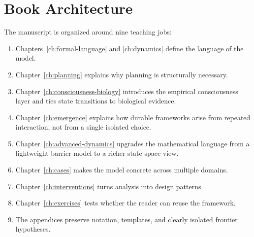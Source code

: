 \section{Book Architecture}

The manuscript is organized around nine teaching jobs:
\begin{enumerate}[nosep]
  \item Chapters~\ref{ch:formal-language} and \ref{ch:dynamics} define the
        language of the model.
  \item Chapter~\ref{ch:planning} explains why planning is structurally
        necessary.
  \item Chapter~\ref{ch:consciousness-biology} introduces the empirical
        consciousness layer and ties state transitions to biological evidence.
  \item Chapter~\ref{ch:emergence} explains how durable frameworks arise from
        repeated interaction, not from a single isolated choice.
  \item Chapter~\ref{ch:advanced-dynamics} upgrades the mathematical language
        from a lightweight barrier model to a richer state-space view.
  \item Chapter~\ref{ch:cases} makes the model concrete across multiple
        domains.
  \item Chapter~\ref{ch:interventions} turns analysis into design patterns.
  \item Chapter~\ref{ch:exercises} tests whether the reader can reuse the
        framework.
  \item The appendices preserve notation, templates, and clearly isolated
        frontier hypotheses.
\end{enumerate}
